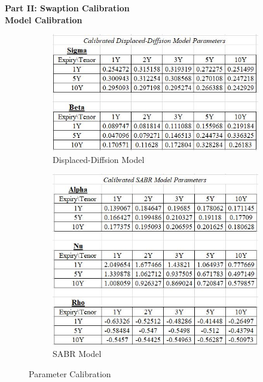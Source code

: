 \documentclass{article}
\begin{document}
\newpage
	
\par \noindent \textbf{Part II: Swaption Calibration}\\
\noindent \textbf{Model Calibration}

\begin{figure}[h]
	\centering
	\begin{subfigure}{.5\textwidth}
		\centering
		\includegraphics[width=1\linewidth]{./images/DD.jpg}
		\caption{Displaced-Diffsion Model}
		\label{fig:sub1}
	\end{subfigure}%
	\begin{subfigure}{.5\textwidth}
		\centering
		\includegraphics[width=0.7\linewidth]{./images/SABR.jpg}
		\caption{SABR Model}
		\label{fig:sub2}
	\end{subfigure}
	\caption{Parameter Calibration}
	\label{fig:test}
\end{figure}
\end{document}
